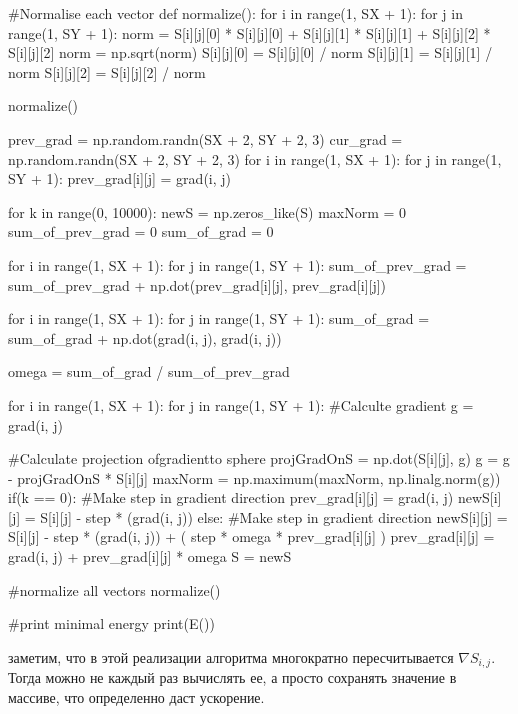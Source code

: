 \documentclass[ 12pt,x11names]{article}
\begin{document}
\begin{python}
#Normalise each vector
def normalize():
    for i in range(1, SX + 1):
        for j in range(1, SY + 1):
            norm = S[i][j][0] * S[i][j][0] + S[i][j][1] * S[i][j][1]
            + S[i][j][2] * S[i][j][2]
            norm = np.sqrt(norm)
            S[i][j][0] = S[i][j][0] / norm
            S[i][j][1] = S[i][j][1] / norm
            S[i][j][2] = S[i][j][2] / norm

normalize()


prev_grad =  np.random.randn(SX + 2, SY + 2, 3)
cur_grad = np.random.randn(SX + 2, SY + 2, 3)
for i in range(1, SX + 1):
    for j in range(1, SY + 1):
        prev_grad[i][j] = grad(i, j)

for k in range(0, 10000):
    newS = np.zeros_like(S)
    maxNorm = 0
    sum_of_prev_grad = 0
    sum_of_grad  =  0


    for i in range(1, SX + 1):
        for j in range(1, SY + 1):
            sum_of_prev_grad = sum_of_prev_grad +
            np.dot(prev_grad[i][j], prev_grad[i][j])

    for i in range(1, SX + 1):
        for j in range(1, SY + 1):
            sum_of_grad = sum_of_grad +
            np.dot(grad(i, j), grad(i, j))

    omega = sum_of_grad / sum_of_prev_grad

    for i in range(1, SX + 1):
        for j in range(1, SY + 1):
            #Calculte gradient
            g = grad(i,  j)

             #Calculate projection ofgradientto sphere
            projGradOnS = np.dot(S[i][j], g)
            g = g - projGradOnS * S[i][j]
            maxNorm = np.maximum(maxNorm, np.linalg.norm(g))
            if(k == 0):
                #Make step in gradient direction
                prev_grad[i][j] = grad(i, j)
                newS[i][j] = S[i][j] -
                step * (grad(i, j))
            else:
                #Make step in gradient direction
                newS[i][j] = S[i][j] - step * (grad(i, j))
                + ( step * omega *  prev_grad[i][j] )
                prev_grad[i][j] = grad(i, j) +
                prev_grad[i][j] * omega
    S = newS

    #normalize all vectors
    normalize()


#print minimal energy
print(E())
 \end{python}
 заметим, что в этой реализации алгоритма многократно пересчитывается $\nabla S_{i, j}$. Тогда можно не каждый раз вычислять ее, а  просто сохранять значение в массиве, что определенно даст ускорение.
\end{document}
